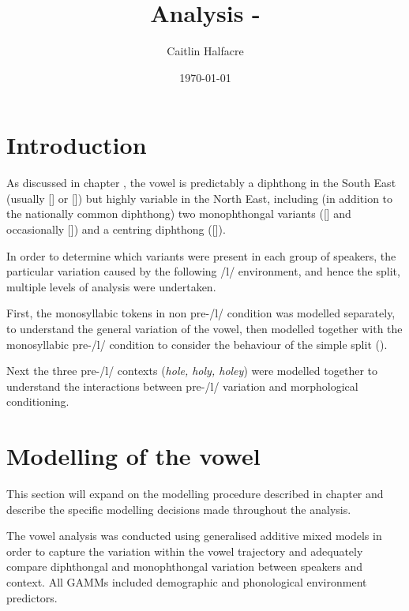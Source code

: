 \documentclass[../../../00.FullDoc/tex/Thesis]{subfiles}
\title{Analysis - \scs{Goat}}
\author{Caitlin Halfacre}
\date{\today}
\begin{document}
	\onlyinsubfile{
	\maketitle
	\pagebreak
	\tableofcontents
	\onehalfspacing
				}
	\pagestyle{scrheadings}
	
\section{Introduction} \label{sec:GGintroduction}
As discussed in chapter \notinsubfile{\ref{ch:LitReview}}, the \goat{} vowel is predictably a diphthong in the South East (usually [] or []) but highly variable in the North East, including (in addition to the nationally common diphthong) two monophthongal variants ([] and occasionally []) and a centring diphthong ([]).

In order to determine which variants were present in each group of speakers, the particular variation caused by the following /l/ environment, and hence the \goat{} split, multiple levels of analysis were undertaken.

First, the monosyllabic tokens in non pre-/l/ condition was modelled separately, to understand the general variation of the \goat{} vowel, then modelled together with the monosyllabic pre-/l/ condition to consider the behaviour of the simple split (\GG{}).

Next the three pre-/l/ contexts (\textit{hole, holy, holey}) were modelled together to understand the interactions between pre-/l/ variation and morphological conditioning.

\section{Modelling of the \goat{} vowel}
This section will expand on the modelling procedure described in chapter  and describe the specific modelling decisions made throughout the analysis.

The \goat{} vowel analysis was conducted using generalised additive mixed models in order to capture the variation within the vowel trajectory and adequately compare diphthongal and monophthongal variation between speakers and context. All GAMMs included demographic and phonological environment predictors.
\end{document}
